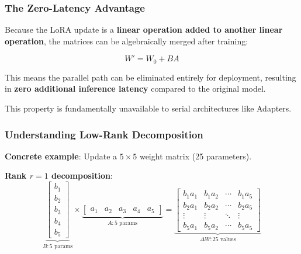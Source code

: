 \documentclass{article}
\begin{document}
\begin{center}
\end{center}

\subsubsection{The Zero-Latency Advantage}

\begin{tcolorbox}[colback=green!5!white, colframe=green!75!black, title=Critical Advantage: Merging for Zero Latency]
Because the LoRA update is a \textbf{linear operation added to another linear operation}, the matrices can be algebraically merged after training:

\[
W' = W_0 + BA
\]

This means the parallel path can be eliminated entirely for deployment, resulting in \textbf{zero additional inference latency} compared to the original model.

This property is fundamentally unavailable to serial architectures like Adapters.
\end{tcolorbox}

\subsubsection{Understanding Low-Rank Decomposition}

\textbf{Concrete example}: Update a $5 \times 5$ weight matrix (25 parameters).

\textbf{Rank $r=1$ decomposition}:
\[
\underbrace{\begin{bmatrix}
b_1 \\ b_2 \\ b_3 \\ b_4 \\ b_5
\end{bmatrix}}_{B: 5 \text{ params}}
\times
\underbrace{\begin{bmatrix}
a_1 & a_2 & a_3 & a_4 & a_5
\end{bmatrix}}_{A: 5 \text{ params}}
=
\underbrace{\begin{bmatrix}
b_1a_1 & b_1a_2 & \cdots & b_1a_5 \\
b_2a_1 & b_2a_2 & \cdots & b_2a_5 \\
\vdots & \vdots & \ddots & \vdots \\
b_5a_1 & b_5a_2 & \cdots & b_5a_5
\end{bmatrix}}_{\Delta W: 25 \text{ values}}
\]
\end{document}
